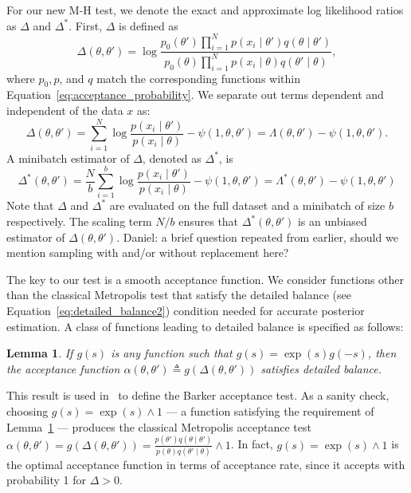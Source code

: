 \documentclass{article}
\newtheorem{lemma}{Lemma}
\begin{document}
For our new M-H test, we denote the exact and approximate log likelihood ratios
as $\Delta$ and $\Delta^*$.  First, $\Delta$ is defined as
\begin{equation}\label{eq:delta1}
    \Delta(\theta,\theta')  =
    \log \frac{p_0(\theta')\prod_{i=1}^N p(x_i \mid \theta')q(\theta \mid
    \theta')}{p_0(\theta)\prod_{i=1}^N p(x_i \mid \theta)q(\theta' \mid\theta)},
\end{equation}
where $p_0, p$, and $q$ match the corresponding functions within
Equation~\ref{eq:acceptance_probability}. We separate out terms dependent and
independent of the data $x$ as:
\begin{equation}\label{eq:delta2}
    \Delta(\theta,\theta') = \sum_{i=1}^N\log\frac{p(x_i\mid\theta')}{p(x_i\mid\theta)} - \psi(1,\theta,\theta') =
    \Lambda(\theta,\theta') - \psi(1,\theta,\theta').
\end{equation}
A minibatch estimator of $\Delta$, denoted as $\Delta^*$, is
\begin{equation}\label{eq:delta3}
    \Delta^*(\theta,\theta') =
\frac{N}{b}\sum_{i=1}^b\log\frac{p(x_i\mid\theta')}{p(x_i\mid\theta)} - \psi(1,\theta,\theta') =
\Lambda^*(\theta,\theta') - \psi(1,\theta,\theta')
\end{equation}
Note that $\Delta$ and $\Delta^*$ are evaluated on the full dataset and a
minibatch of size $b$ respectively. The scaling term $N/b$ ensures that
$\Delta^*(\theta,\theta')$ is an unbiased estimator of $\Delta(\theta,\theta')$.
{\color{blue} Daniel: a brief question repeated from earlier, should we mention
sampling with and/or without replacement here?}

The key to our test is a smooth acceptance function.  We consider functions
other than the classical Metropolis test that satisfy the detailed balance (see
Equation~\ref{eq:detailed_balance2}) condition needed for accurate posterior
estimation. A class of functions leading to detailed balance is specified as
follows:

\begin{lemma}\label{lem:detailed_balance}
    If $g(s)$ is any function such that $g(s) = \exp(s) g(-s)$, then the
    acceptance function $\alpha(\theta,\theta') \triangleq
    g(\Delta(\theta,\theta'))$ satisfies detailed balance.
\end{lemma}

This result is used in~\cite{Barker65} to define the Barker acceptance test.  As
a sanity check, choosing $g(s) = \exp(s) \wedge 1$ --- a function satisfying the
requirement of Lemma~\ref{lem:detailed_balance} --- produces the classical
Metropolis acceptance test $\alpha(\theta,\theta') = g(\Delta(\theta,\theta')) =
\frac{p(\theta')q(\theta \mid \theta')}{p(\theta)q(\theta' \mid \theta)}\wedge
1$. In fact, $g(s) =\exp(s) \wedge 1$ is the optimal acceptance function in
terms of acceptance rate, since it accepts with probability 1 for $\Delta > 0$.
\end{document}
